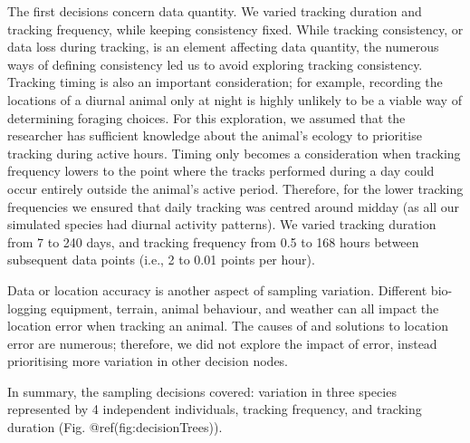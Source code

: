\documentclass[10pt,a4paper]{article}
\begin{document}
The first decisions concern data quantity.
We varied tracking duration and tracking frequency, while keeping consistency fixed.
While tracking consistency, or data loss during tracking, is an element affecting data quantity, the numerous ways of defining consistency led us to avoid exploring tracking consistency.
Tracking timing is also an important consideration; for example, recording the locations of a diurnal animal only at night is highly unlikely to be a viable way of determining foraging choices.
For this exploration, we assumed that the researcher has sufficient knowledge about the animal's ecology to prioritise tracking during active hours.
Timing only becomes a consideration when tracking frequency lowers to the point where the tracks performed during a day could occur entirely outside the animal's active period.
Therefore, for the lower tracking frequencies we ensured that daily tracking was centred around midday (as all our simulated species had diurnal activity patterns).
We varied tracking duration from 7 to 240 days, and tracking frequency from 0.5 to 168 hours between subsequent data points (i.e., 2 to 0.01 points per hour).

Data or location accuracy is another aspect of sampling variation.
Different bio-logging equipment, terrain, animal behaviour, and weather can all impact the location error when tracking an animal.
The causes of and solutions to location error are numerous; therefore, we did not explore the impact of error, instead prioritising more variation in other decision nodes.

In summary, the sampling decisions covered: variation in three species represented by 4 independent individuals, tracking frequency, and tracking duration (Fig. @ref(fig:decisionTrees)).
\end{document}
